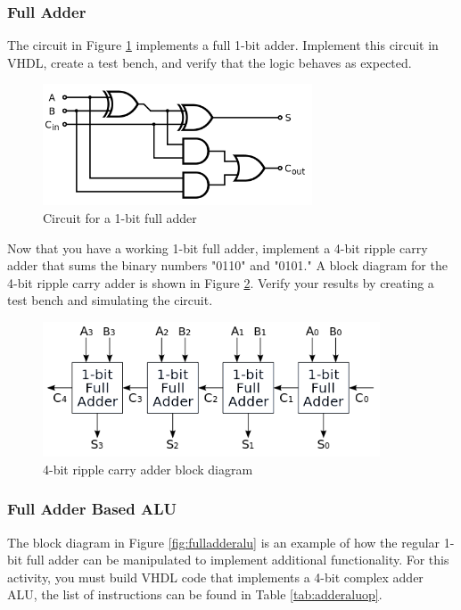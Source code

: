 \subsubsection{Full Adder}
The circuit in Figure \ref{fig:fulladder} implements a full 1-bit adder. Implement this circuit in VHDL, create a test bench, and verify that the logic behaves as expected. 

\begin{figure}[H]
	\centering
	\includegraphics[width=80mm]{Lab3/figures/fulladder.png}
	\caption{Circuit for a 1-bit full adder}
	\label{fig:fulladder}
\end{figure}

Now that you have a working 1-bit full adder, implement a 4-bit ripple carry adder that sums the binary numbers "0110" and "0101." A block diagram for the 4-bit ripple carry adder is shown in Figure \ref{fig:fourbitripple}. Verify your results by creating a test bench and simulating the circuit.

\begin{figure}[H]
	\centering
	\includegraphics[width=100mm]{Lab3/figures/fourbitripple.png}
	\caption{4-bit ripple carry adder block diagram}
	\label{fig:fourbitripple}
\end{figure}

\subsubsection{Full Adder Based ALU}
The block diagram in Figure \ref{fig:fulladderalu} is an example of how the regular 1-bit full adder can be manipulated to implement additional functionality. For this activity, you must build VHDL code that implements a 4-bit complex adder ALU, the list of instructions can be found in Table \ref{tab:adderaluop}.

